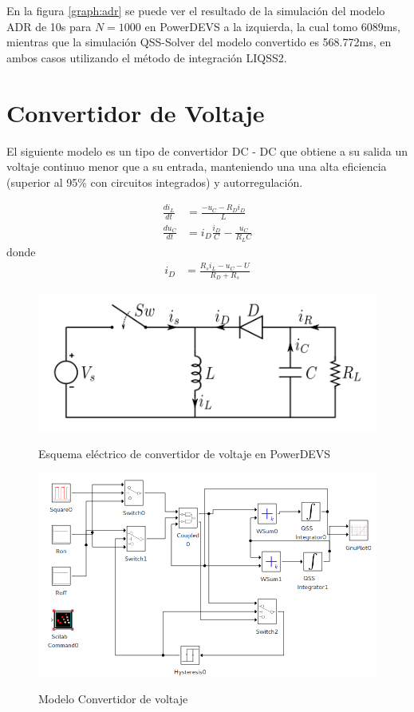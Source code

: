 En la figura \ref{graph:adr} se puede ver el resultado de la simulación del modelo ADR de 10s para $N=1000$ en PowerDEVS a la izquierda, la cual tomo 6089ms,
mientras que la simulación QSS-Solver del modelo convertido es 568.772ms, en ambos casos utilizando el método de integración LIQSS2.

\section{Convertidor de Voltaje}
	El siguiente modelo es un tipo de convertidor DC - DC que obtiene a su  salida  un  voltaje  continuo  menor  que  a  su entrada, manteniendo una una  alta eficiencia (superior al 95\% con circuitos integrados) y autorregulación.

\begin{align*}
\frac{di_{L}}{dt} & = \frac{-u_{C} - R_D i_D }{L}\\
\frac{du_C}{dt} & =i_D \frac{i_D}{C} - \frac{u_C}{R_L C }
\end{align*}
donde
\begin{align*}
i_D & = \frac{R_s i_L - u_C - U }{R_D + R_s}
\end{align*}


\begin{figure}[H]
\centering
 \includegraphics[width=.60\linewidth]{Buckboost_conventions}
 \label{buckdisk-squema}
 \caption{Esquema eléctrico de convertidor de voltaje en PowerDEVS}
\end{figure}

\begin{figure}[H]
\includegraphics[width=0.75\linewidth]{buck_disk}
 \label{model:buckdisk}
\caption{Modelo Convertidor de voltaje}
\end{figure}

